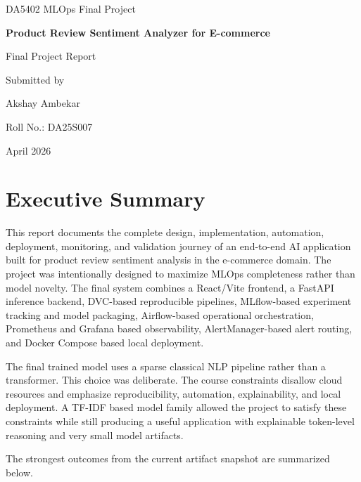 \documentclass[11pt,a4paper]{article}
\newcommand{\projecttitle}{Product Review Sentiment Analyzer for E-commerce}
\newcommand{\coursename}{DA5402 MLOps Final Project}
\begin{document}
\begin{titlepage}
  \thispagestyle{empty}
  \centering
  \vspace*{2.4cm}
  {\Large \coursename \par}
  \vspace{1.6cm}
  {\LARGE \bfseries \projecttitle \par}
  \vspace{2.1cm}
  {\large Final Project Report \par}
  \vspace{1.8cm}
  {\large Submitted by \par}
  \vspace{0.4cm}
  {\Large Akshay Ambekar \par}
  \vspace{0.25cm}
  {\large Roll No.: DA25S007 \par}
  \vfill
  {\large April 2026 \par}
\end{titlepage}
\clearpage
\tableofcontents
\clearpage

\section{Executive Summary}

This report documents the complete design, implementation, automation, deployment, monitoring, and validation journey of an end-to-end AI application built for product review sentiment analysis in the e-commerce domain. The project was intentionally designed to maximize MLOps completeness rather than model novelty. The final system combines a React/Vite frontend, a FastAPI inference backend, DVC-based reproducible pipelines, MLflow-based experiment tracking and model packaging, Airflow-based operational orchestration, Prometheus and Grafana based observability, AlertManager-based alert routing, and Docker Compose based local deployment.

The final trained model uses a sparse classical NLP pipeline rather than a transformer. This choice was deliberate. The course constraints disallow cloud resources and emphasize reproducibility, automation, explainability, and local deployment. A TF-IDF based model family allowed the project to satisfy these constraints while still producing a useful application with explainable token-level reasoning and very small model artifacts.

The strongest outcomes from the current artifact snapshot are summarized below.
\end{document}
